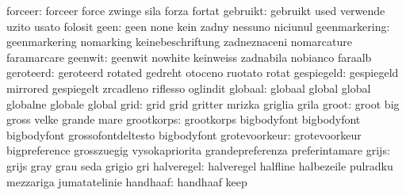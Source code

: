                   forceer: forceer                   force
                           zwinge                    sila
                           forza                     fortat
                 gebruikt: gebruikt                  used
                           verwende                  uzito
                           usato                     folosit
                     geen: geen                      none
                           kein                      zadny
                           nessuno                   niciunul
            geenmarkering: geenmarkering             nomarking
                           keinebeschriftung         zadneznaceni
                           nomarcature               faramarcare
                  geenwit: geenwit                   nowhite
                           keinweiss                 zadnabila
                           nobianco                  faraalb
                geroteerd: geroteerd                 rotated
                           gedreht                   otoceno
                           ruotato                   rotat
               gespiegeld: gespiegeld                mirrored
                           gespiegelt                zrcadleno
                           riflesso                  oglindit
                  globaal: globaal                   global
                           global                    globalne
                           globale                   global
                     grid: grid                      grid
                           gritter                   mrizka
                           griglia                   grila
                    groot: groot                     big
                           gross                     velke
                           grande                    mare
               grootkorps: grootkorps                bigbodyfont
                           bigbodyfont               bigbodyfont
                           grossofontdeltesto        bigbodyfont %
            grotevoorkeur: grotevoorkeur             bigpreference
                           grosszuegig               vysokapriorita
                           grandepreferenza          preferintamare
                    grijs: grijs                     gray
                           grau                      seda
                           grigio                    gri
               halveregel: halveregel                halfline
                           halbezeile                pulradku
                           mezzariga                 jumatatelinie
                 handhaaf: handhaaf                  keep
